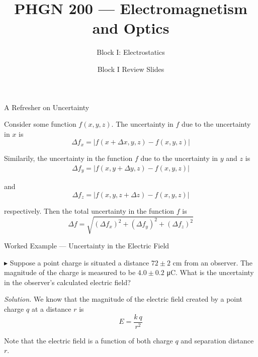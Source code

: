 \documentclass{beamer}
\title{PHGN 200 --- Electromagnetism and Optics}
\subtitle{Block I: Electrostatics}
\author{}
\date{Block I Review Slides}
\begin{document}
\frame{\titlepage}

\begin{frame}{A Refresher on Uncertainty}

Consider some function $f(x,y,z)$. The uncertainty in $f$ due to the uncertainty in $x$ is
\begin{equation*}
    \Delta f_x = \left| f(x + \Delta x, y, z) - f(x,y,z) \right|
\end{equation*}

Similarily, the uncertainty in the function $f$ due to the uncertainty in $y$ and $z$ is
\begin{gather*}
    \Delta f_y = \left| f(x, y + \Delta y, z) - f(x,y,z) \right| 
\end{gather*}

and
\begin{equation*}
    \Delta f_z = \left| f(x,y, z +  \Delta z) - f(x,y,z) \right|
\end{equation*}

respectively. Then the total uncertainty in the function $f$ is
\begin{equation*}
    \Delta f = \sqrt{\left( \Delta f_x \right)^2 + \left( \Delta f_y \right)^2 + \left( \Delta f_z \right)^2}
\end{equation*}

\end{frame}

\begin{frame}{Worked Example --- Uncertainty in the Electric Field}

$\blacktriangleright$ Suppose a point charge is situated a distance $72 \pm 2$ cm from an observer. The magnitude of the charge is measured to be $4.0 \pm 0.2$ \si{\micro\coulomb}. What is the uncertainty in the observer's calculated electric field?

\vfill

\textit{Solution.} We know that the magnitude of the electric field created by a point charge $q$ at a distance $r$ is
\begin{equation*}
    E = \frac{k\ q}{r^2}
\end{equation*}

Note that the electric field is a function of both charge $q$ and separation distance $r$.

\end{frame}
\end{document}
